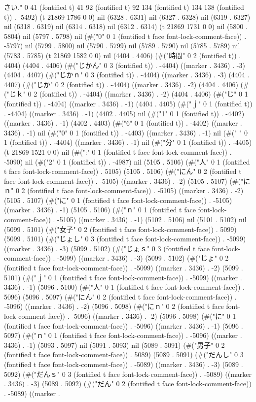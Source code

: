  さい." 0 41 (fontified t) 41 92 (fontified t) 92 134 (fontified t) 134 138 (fontified t)) . -5492) (t 21869 1786 0 0) nil (6328 . 6331) nil (6327 . 6328) nil (6319 . 6327) nil (6318 . 6319) nil (6314 . 6318) nil (6312 . 6314) (t 21869 1731 0 0) nil (5800 . 5804) nil (5797 . 5798) nil (#("0" 0 1 (fontified t face font-lock-comment-face)) . -5797) nil (5799 . 5800) nil (5790 . 5799) nil (5789 . 5790) nil (5785 . 5789) nil (5783 . 5785) (t 21869 1582 0 0) nil (4404 . 4406) (#("時間" 0 2 (fontified t)) . 4404) (4404 . 4406) (#("じかん" 0 3 (fontified t)) . -4404) ((marker . 3436) . -3) (4404 . 4407) (#("じかｎ" 0 3 (fontified t)) . -4404) ((marker . 3436) . -3) (4404 . 4407) (#("じか" 0 2 (fontified t)) . -4404) ((marker . 3436) . -2) (4404 . 4406) (#("じｋ" 0 2 (fontified t)) . -4404) ((marker . 3436) . -2) (4404 . 4406) (#("じ" 0 1 (fontified t)) . -4404) ((marker . 3436) . -1) (4404 . 4405) (#("ｊ" 0 1 (fontified t)) . -4404) ((marker . 3436) . -1) (4402 . 4405) nil (#("1" 0 1 (fontified t)) . -4402) ((marker . 3436) . -1) (4402 . 4403) (#("6" 0 1 (fontified t)) . -4402) ((marker . 3436) . -1) nil (#("0" 0 1 (fontified t)) . -4403) ((marker . 3436) . -1) nil (#(" " 0 1 (fontified t)) . -4404) ((marker . 3436) . -1) nil (#("分" 0 1 (fontified t)) . -4405) (t 21869 1521 0 0) nil (#(":" 0 1 (fontified t face font-lock-comment-face)) . -5090) nil (#("2" 0 1 (fontified t)) . -4987) nil (5105 . 5106) (#("人" 0 1 (fontified t face font-lock-comment-face)) . 5105) (5105 . 5106) (#("にん" 0 2 (fontified t face font-lock-comment-face)) . -5105) ((marker . 3436) . -2) (5105 . 5107) (#("にｎ" 0 2 (fontified t face font-lock-comment-face)) . -5105) ((marker . 3436) . -2) (5105 . 5107) (#("に" 0 1 (fontified t face font-lock-comment-face)) . -5105) ((marker . 3436) . -1) (5105 . 5106) (#("ｎ" 0 1 (fontified t face font-lock-comment-face)) . -5105) ((marker . 3436) . -1) (5102 . 5106) nil (5101 . 5102) nil (5099 . 5101) (#("女子" 0 2 (fontified t face font-lock-comment-face)) . 5099) (5099 . 5101) (#("じょし" 0 3 (fontified t face font-lock-comment-face)) . -5099) ((marker . 3436) . -3) (5099 . 5102) (#("じょｓ" 0 3 (fontified t face font-lock-comment-face)) . -5099) ((marker . 3436) . -3) (5099 . 5102) (#("じょ" 0 2 (fontified t face font-lock-comment-face)) . -5099) ((marker . 3436) . -2) (5099 . 5101) (#("ｊ" 0 1 (fontified t face font-lock-comment-face)) . -5099) ((marker . 3436) . -1) (5096 . 5100) (#("人" 0 1 (fontified t face font-lock-comment-face)) . 5096) (5096 . 5097) (#("にん" 0 2 (fontified t face font-lock-comment-face)) . -5096) ((marker . 3436) . -2) (5096 . 5098) (#("にｎ" 0 2 (fontified t face font-lock-comment-face)) . -5096) ((marker . 3436) . -2) (5096 . 5098) (#("に" 0 1 (fontified t face font-lock-comment-face)) . -5096) ((marker . 3436) . -1) (5096 . 5097) (#("ｎ" 0 1 (fontified t face font-lock-comment-face)) . -5096) ((marker . 3436) . -1) (5093 . 5097) nil (5091 . 5093) nil (5089 . 5091) (#("男子" 0 2 (fontified t face font-lock-comment-face)) . 5089) (5089 . 5091) (#("だんし" 0 3 (fontified t face font-lock-comment-face)) . -5089) ((marker . 3436) . -3) (5089 . 5092) (#("だんｓ" 0 3 (fontified t face font-lock-comment-face)) . -5089) ((marker . 3436) . -3) (5089 . 5092) (#("だん" 0 2 (fontified t face font-lock-comment-face)) . -5089) ((marker . 